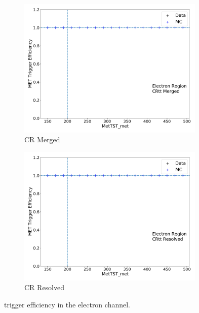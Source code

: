 \begin{figure}[tb]
  \centering
     \begin{subfigure}{0.49\textwidth}
     \includegraphics[width = 0.98\textwidth]{Figures/4/trig/trig_e/CRtt Merged/MetTST_met.pdf}
     \caption{\ttbar CR Merged}
     \end{subfigure}
     \begin{subfigure}{0.49\textwidth}
     \includegraphics[width = 0.98\textwidth]{Figures/4/trig/trig_e/CRtt Resolved/MetTST_met.pdf}
     \caption{\ttbar CR Resolved}
     \end{subfigure}
  \caption{\met trigger efficiency in the electron channel.}
  \label{fig:trig_e}
\end{figure}

